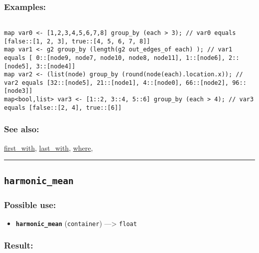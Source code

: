 \documentclass[]{book}
\providecommand{\tightlist}{%
  \setlength{\itemsep}{0pt}\setlength{\parskip}{0pt}}
\theoremstyle{definition}
\theoremstyle{definition}
\theoremstyle{definition}
\theoremstyle{remark}
\begin{document}
\subsubsection{Examples:}\label{examples-184}

\begin{verbatim}
 
map var0 <- [1,2,3,4,5,6,7,8] group_by (each > 3); // var0 equals [false::[1, 2, 3], true::[4, 5, 6, 7, 8]] 
map var1 <- g2 group_by (length(g2 out_edges_of each) ); // var1 equals [ 0::[node9, node7, node10, node8, node11], 1::[node6], 2::[node5], 3::[node4]] 
map var2 <- (list(node) group_by (round(node(each).location.x)); // var2 equals [32::[node5], 21::[node1], 4::[node0], 66::[node2], 96::[node3]] 
map<bool,list> var3 <- [1::2, 3::4, 5::6] group_by (each > 4); // var3 equals [false::[2, 4], true::[6]]
\end{verbatim}

\subsubsection{See also:}\label{see-also-109}

\href{operators-d-to-h.html\#first_with}{first\_with},
\href{operators-i-to-m.html\#last_with}{last\_with},
\href{operators-s-to-z.html\#where}{where},

\begin{center}\rule{0.5\linewidth}{\linethickness}\end{center}

\subsection{\texorpdfstring{\texttt{harmonic\_mean}}{harmonic\_mean}}\label{harmonic_mean}

\subsubsection{Possible use:}\label{possible-use-245}

\begin{itemize}
\tightlist
\item
  \textbf{\texttt{harmonic\_mean}} (\texttt{container})
  ---\textgreater{} \texttt{float}
\end{itemize}

\subsubsection{Result:}\label{result-236}
\end{document}
